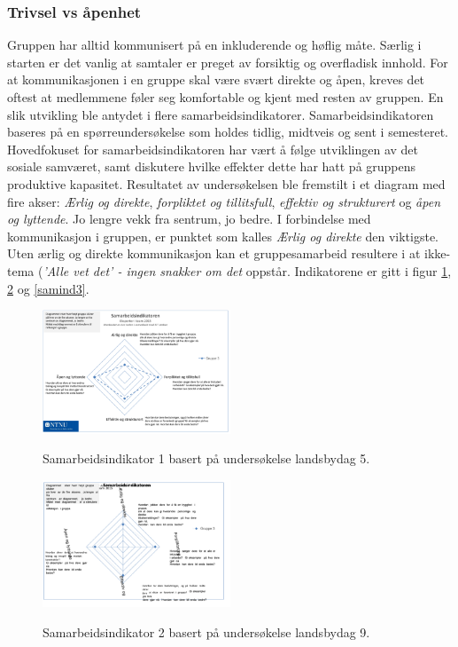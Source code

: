 \subsubsection{Trivsel vs åpenhet}

Gruppen har alltid kommunisert på en inkluderende og høflig måte. 
Særlig i starten er det vanlig at samtaler er preget av forsiktig og overfladisk innhold. 
For at kommunikasjonen i en gruppe skal være svært direkte og åpen, kreves det oftest at medlemmene føler seg komfortable og kjent med resten av gruppen. 
En slik utvikling ble antydet i flere samarbeidsindikatorer. 
Samarbeidsindikatoren baseres på en spørreundersøkelse som holdes tidlig, midtveis og sent i semesteret. \\

Hovedfokuset for samarbeidsindikatoren har vært å følge utviklingen av det sosiale samværet, samt diskutere hvilke effekter dette har hatt på gruppens produktive kapasitet. Resultatet av undersøkelsen ble fremstilt i et diagram med fire akser: \textit{Ærlig og direkte}, \textit{forpliktet og tillitsfull}, \textit{effektiv og strukturert} og \textit{åpen og lyttende}. Jo lengre vekk fra sentrum, jo bedre. I forbindelse med kommunikasjon i gruppen, er punktet som kalles \textit{Ærlig og direkte} den viktigste. Uten ærlig og direkte kommunikasjon kan et gruppesamarbeid resultere i at ikke-tema (\textit{'Alle vet det' - ingen snakker om det} oppstår. Indikatorene er gitt i figur \ref{samind1}, \ref{samind2} og \ref{samind3}.

\begin{figure}[h!]
  \caption{Samarbeidsindikator 1 basert på undersøkelse landsbydag 5.}
  \centering
    \includegraphics[width=0.5\textwidth]{Bilder/samarbeidsindikator1.png}
    \label{samind1}
\end{figure}

\begin{figure}[h!]
  \caption{Samarbeidsindikator 2 basert på undersøkelse landsbydag 9.}
  \centering
    \includegraphics[width=0.5\textwidth]{Bilder/samarbeidsindikator_2.png}
    \label{samind2}
\end{figure}

